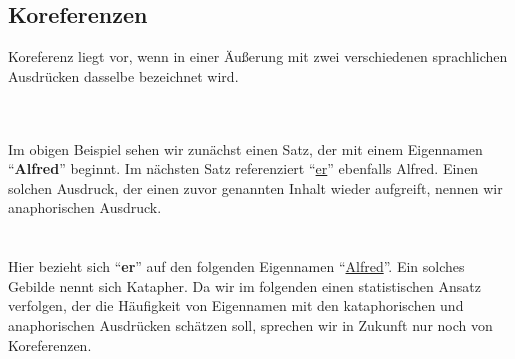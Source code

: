 \subsection{Koreferenzen}

\begin{defi}
	Koreferenz liegt vor, wenn in einer Äußerung mit zwei verschiedenen sprachlichen Ausdrücken dasselbe bezeichnet wird. \cite{wiki:Koreferenz}
\end{defi}

\\
\\
Im obigen Beispiel sehen wir zunächst einen Satz, der mit einem Eigennamen ``\textbf{Alfred}'' beginnt. Im nächsten Satz referenziert ``\underline{er}'' ebenfalls Alfred. Einen solchen Ausdruck, der einen zuvor genannten Inhalt wieder aufgreift, nennen wir anaphorischen Ausdruck.\\
\\
\\
Hier bezieht sich ``\textbf{er}'' auf den folgenden Eigennamen ``\underline{Alfred}''. Ein solches Gebilde nennt sich Katapher. Da wir im folgenden einen statistischen Ansatz verfolgen, der die Häufigkeit von Eigennamen mit den kataphorischen und anaphorischen Ausdrücken schätzen soll, sprechen wir in Zukunft nur noch von Koreferenzen.
